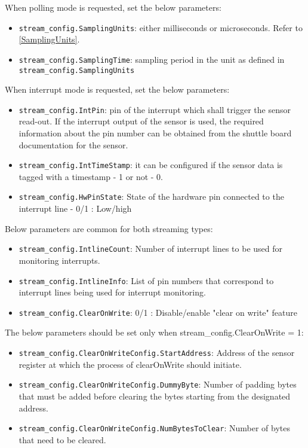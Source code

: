\vspace{12pt}
When polling mode is requested, set the below parameters:
\begin{itemize}
	\item \texttt{stream\_config.SamplingUnits}: either milliseconds or microseconds. Refer to \ref{SamplingUnits}.
	\item \texttt{stream\_config.SamplingTime}: sampling period in the unit as defined in \\ \texttt{stream\_config.SamplingUnits}
\end{itemize}
\vspace{12pt}
When interrupt mode is requested, set the below parameters:
\begin{itemize}
	\item \texttt{stream\_config.IntPin}: pin of the interrupt which shall trigger the sensor read-out. If the interrupt output of the sensor is used, the required information about the pin number can be obtained from the shuttle board documentation for the sensor.
	\item \texttt{stream\_config.IntTimeStamp}:  it can be configured if the sensor data is tagged with a timestamp - 1 or not - 0.
	\item \texttt{stream\_config.HwPinState}: State of the hardware pin connected to the interrupt line - 0/1 : Low/high
\end{itemize}
\vspace{12pt}
Below parameters are common for both streaming types:
\begin{itemize}
	\item \texttt{stream\_config.IntlineCount}: Number of interrupt lines to be used for monitoring interrupts.
	\item \texttt{stream\_config.IntlineInfo}: List of pin numbers that correspond to interrupt lines being used for interrupt monitoring.
	\item \texttt{stream\_config.ClearOnWrite}: 0/1 : Disable/enable "clear on write" feature
\end{itemize}
\vspace{12pt}
The below parameters should be set only when stream\_config.ClearOnWrite = 1:
\begin{itemize}
	\item \texttt{stream\_config.ClearOnWriteConfig.StartAddress}: Address of the sensor register at which the process of clearOnWrite should initiate.
	\item \texttt{stream\_config.ClearOnWriteConfig.DummyByte}: Number of padding bytes that must be added before clearing the bytes starting from the designated address.
	\item \texttt{stream\_config.ClearOnWriteConfig.NumBytesToClear}: Number of bytes that need to be cleared.
\end{itemize}
